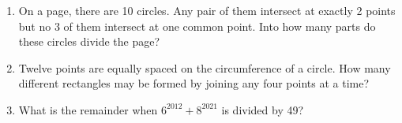 \documentclass{article}
\begin{document}
\begin{enumerate}
\item %
On a page, there are 10 circles. Any pair of them intersect at exactly 2 points but no 3 of
them intersect at one common point. Into how many parts do these circles divide the page?
\vspace{3mm}

\item %
Twelve points are equally spaced on the circumference of a circle. How many different rectangles may be formed by joining any four points at a time?
\vspace{3mm}

\item %
What is the remainder when $6^{2012} + 8^{2021}$ is divided by 49?
\vspace{3mm}

\end{enumerate}
\end{document}
